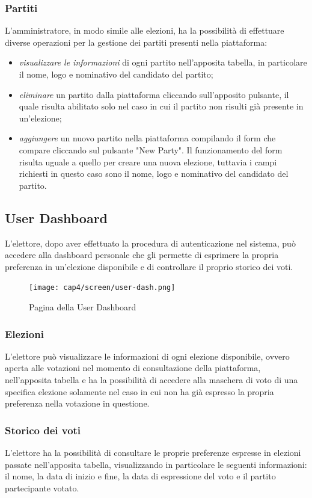 \subsubsection{Partiti}
L'amministratore, in modo simile alle elezioni, ha la possibilità di effettuare diverse operazioni per la gestione dei partiti presenti nella piattaforma:
\begin{itemize}
    \item \textit{visualizzare le informazioni} di ogni partito nell'apposita tabella, in particolare il nome, logo e nominativo del candidato del partito;
    \item \textit{eliminare} un partito dalla piattaforma cliccando sull'apposito pulsante, il quale risulta abilitato solo nel caso in cui il partito non risulti già presente in un'elezione;
    \item \textit{aggiungere} un nuovo partito nella piattaforma compilando il form che compare cliccando sul pulsante "New Party". Il funzionamento del form risulta uguale a quello per creare una nuova elezione, tuttavia i campi richiesti in questo caso sono il nome, logo e nominativo del candidato del partito.
\end{itemize}

\subsection{User Dashboard}
L'elettore, dopo aver effettuato la procedura di autenticazione nel sistema, può accedere alla dashboard personale che gli permette di esprimere la propria preferenza in un'elezione disponibile e di controllare il proprio storico dei voti.
\begin{figure}[H] 
    \centering 
    \texttt{[image: cap4/screen/user-dash.png]} 
    \caption{Pagina della User Dashboard}
\end{figure}

\subsubsection{Elezioni}
L'elettore può visualizzare le informazioni di ogni elezione disponibile, ovvero aperta alle votazioni nel momento di consultazione della piattaforma, nell'apposita tabella e ha la possibilità di accedere alla maschera di voto di una specifica elezione solamente nel caso in cui non ha già espresso la propria preferenza nella votazione in questione.
\subsubsection{Storico dei voti}
L'elettore ha la possibilità di consultare le proprie preferenze espresse in elezioni passate nell'apposita tabella, visualizzando in particolare le seguenti informazioni: il nome, la data di inizio e fine, la data di espressione del voto e il partito partecipante votato.

